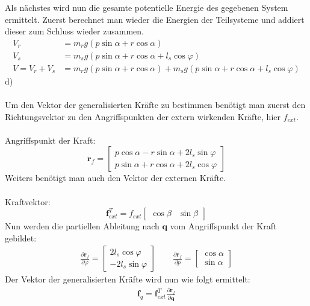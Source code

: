 	\newpage
	\noindent
	Als nächstes wird nun die gesamte potentielle Energie des gegebenen System ermittelt. Zuerst berechnet man wieder die Energien der Teilsysteme und addiert dieser zum Schluss wieder zusammen.
	\begin{align*}
		V_r &= m_rg\left(p\sin\alpha + r\cos\alpha\right) \\
		V_s &= m_sg\left(p\sin\alpha + r\cos\alpha + l_s\cos\varphi\right) \\
		V = V_r + V_s &= m_rg\left(p\sin\alpha + r\cos\alpha\right) + m_sg\left(p\sin\alpha + r\cos\alpha + l_s\cos\varphi\right)
	\end{align*}
	d)\\ \\
	Um den Vektor der generalisierten Kräfte zu bestimmen benötigt man zuerst den Richtungsvektor zu den Angriffspunkten der extern wirkenden Kräfte, hier $f_{ext}$. \\ \\
	Angriffspunkt der Kraft:
	\[
		\textbf{r}_f = \left[\begin{matrix}
			p\cos\alpha - r\sin\alpha + 2l_s\sin\varphi \\
			p\sin\alpha + r\cos\alpha + 2l_s\cos\varphi
		\end{matrix}\right]
	\]
	Weiters benötigt man auch den Vektor der externen Kräfte. \\ \\
	Kraftvektor:
	\[
		\textbf{f}_{ext}^T = f_{ext}\left[\begin{matrix}
			\cos\beta & \sin\beta
		\end{matrix}\right]
	\]
	Nun werden die partiellen Ableitung nach $\textbf{q}$ vom Angriffspunkt der Kraft gebildet:
	\begin{align*}
		\frac{\partial\textbf{r}_f}{\partial\varphi} = \left[\begin{matrix}
			2l_s\cos\varphi \\
			-2l_s\sin\varphi
		\end{matrix}\right] \qquad
		\frac{\partial\textbf{r}_f}{\partial p} = \left[\begin{matrix}
			\cos\alpha \\
			\sin\alpha
		\end{matrix}\right]
	\end{align*}
	Der Vektor der generalisierten Kräfte wird nun wie folgt ermittelt:
	\begin{align*}
		\textbf{f}_q = \textbf{f}_{ext}^T \frac{\partial \textbf{r}_f}{\partial \textbf{q}}
	\end{align*}
